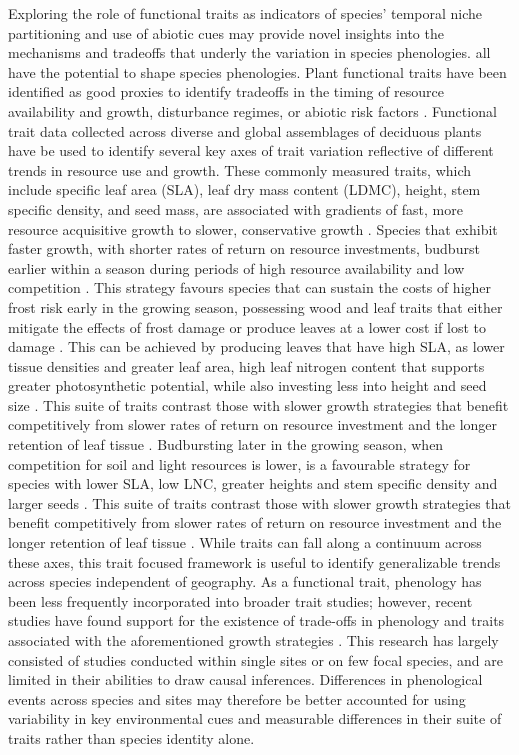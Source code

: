 \documentclass{article}\usepackage[]{graphicx}\usepackage[]{color}
\begin{document}
Exploring the role of functional traits as indicators of species' temporal niche partitioning and use of abiotic cues may provide novel insights into the mechanisms and tradeoffs that underly the variation in species phenologies.  all have the potential to shape species phenologies. Plant functional traits have been identified as good proxies to identify tradeoffs in the timing of resource availability and growth, disturbance regimes, or abiotic risk factors \citep{citation}. Functional trait data collected across diverse and global assemblages of deciduous plants have be used to identify several key axes of trait variation reflective of different trends in resource use and growth. These commonly measured traits, which include specific leaf area (SLA), leaf dry mass content (LDMC), height, stem specific density, and seed mass, are associated with gradients of fast, more resource acquisitive growth to slower, conservative growth \citep{citation}. Species that exhibit faster growth, with shorter rates of return on resource investments, budburst earlier within a season during periods of high resource availability and low competition \citep{citation}. This strategy favours species that can sustain the costs of higher frost risk early in the growing season, possessing wood and leaf traits that either mitigate the effects of frost damage or produce leaves at a lower cost if lost to damage \citep{citation}. This can be achieved by producing leaves that have high SLA, as lower tissue densities and greater leaf area, high leaf nitrogen content that supports greater photosynthetic potential, while also investing less into height and seed size \citep{citation}. This suite of traits contrast those with slower growth strategies that benefit competitively from slower rates of return on resource investment and the longer retention of leaf tissue \citep{citation}. Budbursting later in the growing season, when competition for soil and light resources is lower, is a favourable strategy for species with lower SLA, low LNC, greater heights and stem specific density and larger seeds \citep{citation}. This suite of traits contrast those with slower growth strategies that benefit competitively from slower rates of return on resource investment and the longer retention of leaf tissue \citep{citation}. While traits can fall along a continuum across these axes, this trait focused framework is useful to identify generalizable trends across species independent of geography. As a functional trait, phenology has been less frequently incorporated into broader trait studies; however, recent studies have found support for the existence of trade-offs in phenology and traits associated with the aforementioned growth strategies \citep{citations from Kelly's review}. This research has largely consisted of studies conducted within single sites or on few focal species, and are limited in their abilities to draw causal inferences. Differences in phenological events across species and sites may therefore be better accounted for using variability in key environmental cues and measurable differences in their suite of traits rather than species identity alone. %
\end{document}
